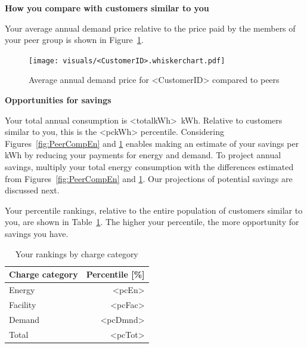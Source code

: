 \documentclass[10pt]{article}
\begin{document}
\vspace{3ex}
\textbf{\Large How you compare with customers similar to you}
\vspace{1ex}

Your average annual demand price relative to the price paid by the members of your peer group is shown in Figure~\ref{fig:PeerCompDmnd}.

\begin{figure}[!h]
\centering
\texttt{[image: visuals/<CustomerID>.whiskerchart.pdf]}
\caption{Average annual demand price for <CustomerID> compared to peers}
\label{fig:PeerCompDmnd}
\end{figure}

\vspace{3ex}
\textbf{\Large Opportunities for savings}
\vspace{1ex}

Your total annual consumption is <totalkWh>~kWh.
Relative to customers similar to you, this is the <pckWh> percentile.
Considering Figures~\ref{fig:PeerCompEn} and \ref{fig:PeerCompDmnd} enables making an estimate of your savings per kWh by reducing your payments for energy and demand.
To project annual savings, multiply your total energy consumption with the differences estimated from Figures~\ref{fig:PeerCompEn} and \ref{fig:PeerCompDmnd}.
Our projections of potential savings are discussed next. 

\pagestyle{savings}

Your percentile rankings, relative to the entire population of customers similar to you, are shown in Table~\ref{tab:percentiles}. 
The higher your percentile, the more opportunity for savings you have. 

\begin{table}[th!]
  \centering
  \caption{Your rankings by charge category}
  \vspace{1.5ex}
  \label{tab:percentiles}
  \begin{tabular}{p{1.25in}r}
    Charge category & Percentile [\%] \\
    \midrule
    Energy & <pcEn> \\
    Facility & <pcFac> \\
    Demand & <pcDmnd> \\
    \midrule
    Total & <pcTot>
  \end{tabular}
\end{table}
\end{document}

